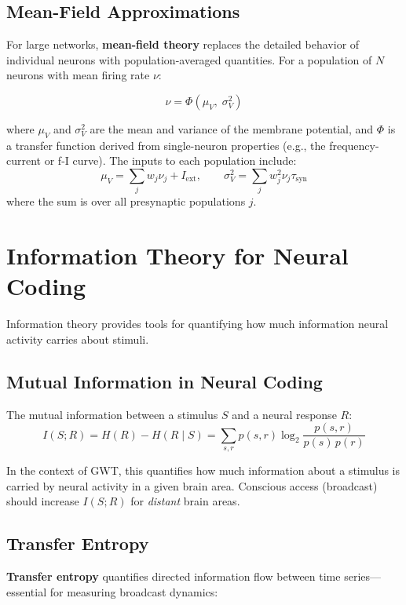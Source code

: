\documentclass[11pt,a4paper]{report}
\begin{document}
\subsection{Mean-Field Approximations}

For large networks, \textbf{mean-field theory} replaces the detailed behavior of individual neurons with population-averaged quantities. For a population of $N$ neurons with mean firing rate $\nu$:

\begin{mathbox}
\vspace{-8pt}
\[
  \nu = \Phi\!\left(\mu_V,\; \sigma_V^2\right)
\]
\vspace{-10pt}
\end{mathbox}

where $\mu_V$ and $\sigma_V^2$ are the mean and variance of the membrane potential, and $\Phi$ is a transfer function derived from single-neuron properties (e.g., the frequency-current or f-I curve). The inputs to each population include:
\[
  \mu_V = \sum_j w_j \nu_j + I_{\text{ext}}, \qquad \sigma_V^2 = \sum_j w_j^2 \nu_j \tau_{\text{syn}}
\]
where the sum is over all presynaptic populations $j$.

\section{Information Theory for Neural Coding}

Information theory provides tools for quantifying how much information neural activity carries about stimuli.

\subsection{Mutual Information in Neural Coding}

The mutual information between a stimulus $S$ and a neural response $R$:
\[
  I(S; R) = H(R) - H(R \mid S) = \sum_{s, r} p(s, r) \log_2 \frac{p(s, r)}{p(s)\, p(r)}
\]

In the context of GWT, this quantifies how much information about a stimulus is carried by neural activity in a given brain area. Conscious access (broadcast) should increase $I(S; R)$ for \emph{distant} brain areas.

\subsection{Transfer Entropy}

\textbf{Transfer entropy} quantifies directed information flow between time series---essential for measuring broadcast dynamics:
\end{document}
